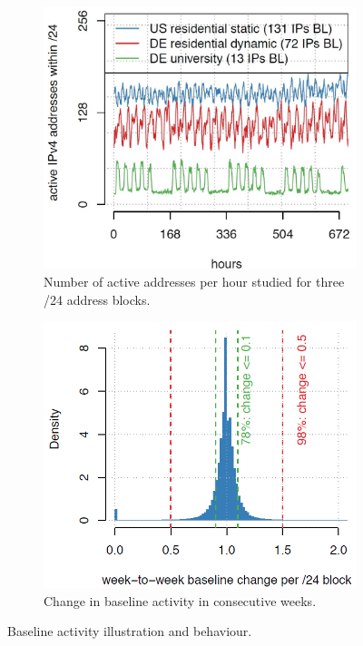 \documentclass[11pt,twoside,a4paper]{article}
\begin{document}
\begin{figure}[h!]
  \centering
  \begin{subfigure}[b]{0.4\linewidth}
    \includegraphics[width=\linewidth]{Figures/1a.png}
    \caption{Number of active addresses per hour studied for three /24 address blocks.}
  \end{subfigure}
  \begin{subfigure}[b]{0.4\linewidth} \hspace{6mm}
    \includegraphics[width=\linewidth]{Figures/1c.png}
    \caption{Change in baseline activity in consecutive weeks.}
  \end{subfigure}
  \caption{Baseline activity illustration and behaviour.}
  \label{fig:BaselineDef}
\end{figure}
\end{document}
